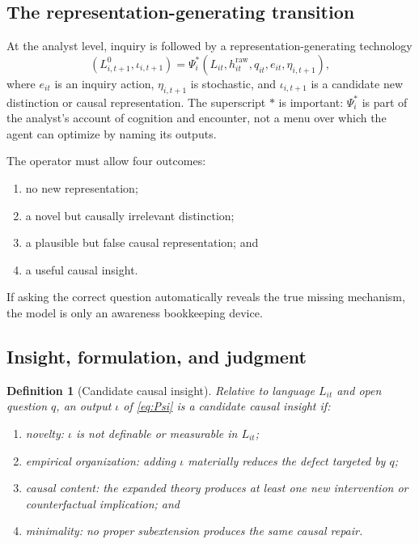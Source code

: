 \documentclass[11pt]{article}
\newtheorem{definition}[proposition]{Definition}
\begin{document}
	\subsection{The representation-generating transition}
	
	At the analyst level, inquiry is followed by a representation-generating technology
	\begin{equation}
		\label{eq:Psi}
		(L_{i,t+1}^{0},\iota_{i,t+1})
		=
		\Psi_i^*(L_{it},h_{it}^{\mathrm{raw}},q_{it},e_{it},\eta_{i,t+1}),
	\end{equation}
	where $e_{it}$ is an inquiry action, $\eta_{i,t+1}$ is stochastic, and $\iota_{i,t+1}$ is a candidate new distinction or causal representation.  The superscript $*$ is important: $\Psi_i^*$ is part of the analyst's account of cognition and encounter, not a menu over which the agent can optimize by naming its outputs.
	
	The operator must allow four outcomes:
	\begin{enumerate}
		\item no new representation;
		\item a novel but causally irrelevant distinction;
		\item a plausible but false causal representation; and
		\item a useful causal insight.
	\end{enumerate}
	If asking the correct question automatically reveals the true missing mechanism, the model is only an awareness bookkeeping device.
	
	\subsection{Insight, formulation, and judgment}
	
	\begin{definition}[Candidate causal insight]
		Relative to language $L_{it}$ and open question $q$, an output $\iota$ of \eqref{eq:Psi} is a candidate causal insight if:
		\begin{enumerate}[label=(\roman*)]
			\item \emph{novelty:} $\iota$ is not definable or measurable in $L_{it}$;
			\item \emph{empirical organization:} adding $\iota$ materially reduces the defect targeted by $q$;
			\item \emph{causal content:} the expanded theory produces at least one new intervention or counterfactual implication; and
			\item \emph{minimality:} no proper subextension produces the same causal repair.
		\end{enumerate}
	\end{definition}
	
\end{document}

